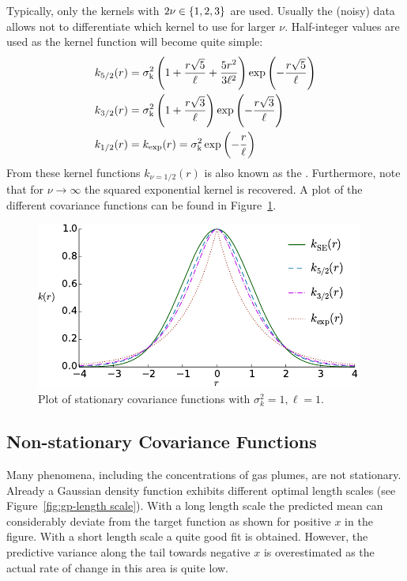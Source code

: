 Typically, only the kernels with $2\nu \in \cbr{1, 2, 3}$ are used.  Usually the 
(noisy) data allows not to differentiate which kernel to use for larger $\nu$.  
Half-integer values are used as the kernel function will become quite simple:
\begin{align}
    k_{5/2}(r) &= \sigma\ped{k}^2 \del{1 + \frac{r\sqrt{5}}{\ell} 
        + \frac{5r^2}{3\ell^2}} \exp\del{-\frac{r\sqrt{5}}{\ell}} \\
    k_{3/2}(r) &= \sigma\ped{k}^2 \del{1 + \frac{r\sqrt{3}}{\ell}} 
    \exp\del{-\frac{r\sqrt{3}}{\ell}} \\
    k_{1/2}(r) &= k_{\exp}(r) = \sigma\ped{k}^2 \exp\del{-\frac{r}{\ell}}
\end{align}
From these kernel functions $k_{\nu=1/2}(r)$ is also known as the 
. Furthermore, note that for $\nu \rightarrow 
\infty$ the squared exponential kernel is recovered. A plot of the different 
covariance functions can be found in Figure~\ref{fig:kernels}.

\begin{figure}
    \centering
    \includegraphics{plots/kernels}
    \caption[Covariance functions]{Plot of stationary covariance functions with 
        $\sigma_k^2 = 1, \ell = 1$.}\label{fig:kernels}
\end{figure}

\subsection{Non-stationary Covariance Functions}
Many phenomena, including the concentrations of gas plumes, are not stationary.  
Already a Gaussian density function exhibits different optimal length scales 
(see Figure~\ref{fig:gp-length scale}).  With a long length scale the predicted 
mean can considerably deviate from the target function as shown for positive $x$ 
in the figure. With a short length scale a quite good fit is obtained. However, 
the predictive variance along the tail towards negative $x$ is overestimated as 
the actual rate of change in this area is quite low.


